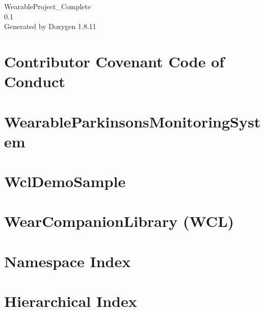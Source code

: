 \documentclass[twoside]{book}
\newcommand{\+}{\discretionary{\mbox{\scriptsize$\hookleftarrow$}}{}{}}
\newcommand{\clearemptydoublepage}{%
  \newpage{\pagestyle{empty}\cleardoublepage}%
}
\begin{document}
\hypersetup{pageanchor=false,
             bookmarksnumbered=true,
             pdfencoding=unicode
            }
\begin{titlepage}
\vspace*{7cm}
\begin{center}%
{\Large Wearable\+Project\+\_\+\+Complete \\[1ex]\large 0.\+1 }\\
\vspace*{1cm}
{\large Generated by Doxygen 1.8.11}\\
\end{center}
\end{titlepage}
\clearemptydoublepage
\tableofcontents
\clearemptydoublepage
{}
\hypersetup{pageanchor=true}

\chapter{Contributor Covenant Code of Conduct}
\label{md_CODE_OF_CONDUCT}
\hypertarget{md_CODE_OF_CONDUCT}{}

\chapter{Wearable\+Parkinsons\+Monitoring\+System}
\label{md_README}
\hypertarget{md_README}{}

\chapter{Wcl\+Demo\+Sample}
\label{md_WearableProject_Complete_WclDemoSample_README}
\hypertarget{md_WearableProject_Complete_WclDemoSample_README}{}

\chapter{Wear\+Companion\+Library (W\+CL)}
\label{md_WearableProject_Complete_WearCompanionLibrary_README}
\hypertarget{md_WearableProject_Complete_WearCompanionLibrary_README}{}

\chapter{Namespace Index}

\chapter{Hierarchical Index}

\end{document}
